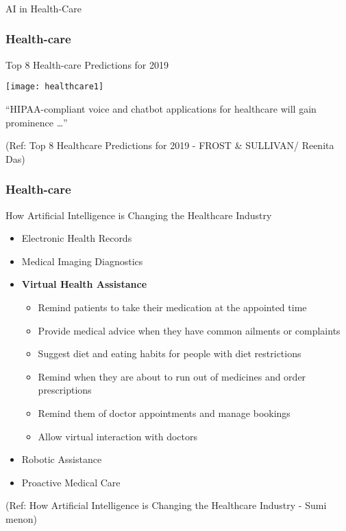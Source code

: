 \begin{frame}[fragile]\frametitle{}
\begin{center}
{\Large AI in Health-Care}
\end{center}
\end{frame}

\begin{frame}[fragile]\frametitle{Health-care}
Top 8 Health-care Predictions for 2019

\begin{center}
\texttt{[image: healthcare1]}
\end{center}

``HIPAA-compliant voice and chatbot applications for healthcare will gain prominence \ldots''

{\tiny (Ref: Top 8 Healthcare Predictions for 2019 - FROST \& SULLIVAN/ Reenita Das)}
\end{frame}

\begin{frame}[fragile]\frametitle{Health-care}
How Artificial Intelligence is Changing the Healthcare Industry

\begin{itemize}
\item Electronic Health Records
\item Medical Imaging Diagnostics
\item {\bf Virtual Health Assistance}
\begin{itemize}
\item Remind patients to take their medication at the appointed time
\item Provide medical advice when they have common ailments or complaints
\item  Suggest diet and eating habits for people with diet restrictions
\item  Remind when they are about to run out of medicines and order prescriptions
\item  Remind them of doctor appointments and manage bookings
\item  Allow virtual interaction with doctors
\end{itemize}
\item Robotic Assistance
\item Proactive Medical Care
\end{itemize}

{\tiny (Ref: How Artificial Intelligence is Changing the Healthcare Industry - Sumi menon)}
\end{frame}

